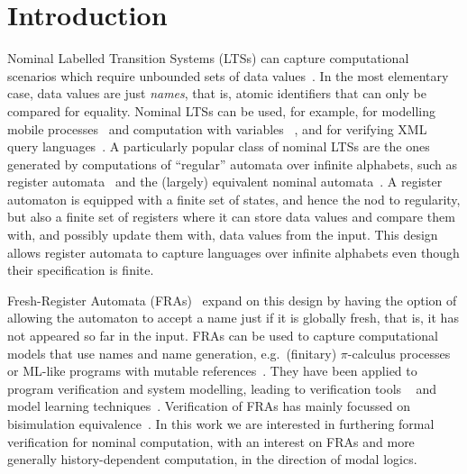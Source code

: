 \documentclass[10pt,a4paper]{article}
\theoremstyle{definition}
\theoremstyle{remark}
\begin{document}
\section{Introduction}

Nominal Labelled Transition Systems (LTSs) can capture computational scenarios which
require unbounded sets of data values~\cite{automatanominalsets}.
In the most elementary case, data values are just \emph{names}, that is, atomic identifiers that can only be compared for equality. Nominal LTSs can be used,
for example, for modelling mobile processes~\cite{HDA1}
and computation with variables ~\cite{KAMINSKI1994329,GrumbergKS10}, and for verifying XML query languages~\cite{SCHWENTICK2007289}.
A particularly popular class of nominal LTSs are the ones generated by computations of ``regular'' automata over infinite alphabets, such as register automata~\cite{KAMINSKI1994329} and the (largely) equivalent nominal automata~\cite{automatanominalsets}. A register automaton is 
equipped with a finite set of states, and hence the nod to regularity, but also a finite set of registers where it can store data values and compare them with, and possibly update them with, data values from the input. This design allows register automata to capture languages over infinite alphabets even though their specification is finite.



Fresh-Register Automata (FRAs)~\cite{fra} expand on this design by having the option of allowing the automaton to accept a name just if it is globally fresh, that is, it has not appeared so far in the input.
FRAs
 can be used to capture computational models that use names and
name generation, e.g.\ (finitary) $\pi$-calculus processes~\cite{fra,DBLP:journals/jsa/BandukaraT23} or ML-like programs with mutable references~\cite{nominalgamesemantics}.
 They have been applied to program verification and system modelling, leading to verification tools ~\cite{imj,nominalgamesemantics,runtimeverira} and model learning techniques~\cite{RCDL,LearningRAFreshval}.
Verification of FRAs has mainly focussed on bisimulation equivalence~\cite{fra,BFRA,deqtheory}. In this work we are interested in furthering formal
verification for nominal computation, with an interest on FRAs and more generally history-dependent computation, in the direction of modal logics.
\end{document}
